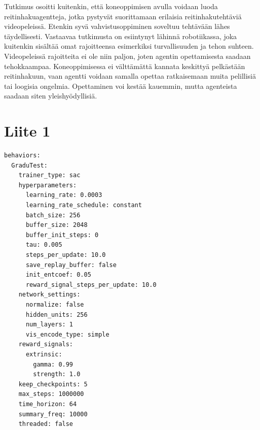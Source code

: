 \documentclass[utf8]{gradu3}
\begin{document}
Tutkimus osoitti kuitenkin, että koneoppimisen avulla voidaan luoda reitinhakuagentteja, jotka pystyvät suorittamaan erilaisia reitinhakutehtäviä videopeleissä. Etenkin syvä vahvistusoppiminen soveltuu tehtävään lähes täydellisesti. Vastaavaa tutkimusta on esiintynyt lähinnä robotiikassa, joka kuitenkin sisältää omat rajoitteensa esimerkiksi turvallisuuden ja tehon suhteen. Videopeleissä rajoitteita ei ole niin paljon, joten agentin opettamisesta saadaan tehokkaampaa. Koneoppimisessa ei välttämättä kannata keskittyä pelkästään reitinhakuun, vaan agentti voidaan samalla opettaa ratkaisemaan muita pelillisiä tai loogisia ongelmia. Opettaminen voi kestää kauemmin, mutta agenteista saadaan siten yleishyödyllisiä.

\printbibliography


\appendix

\section{Liite 1}
\label{hyperparametrit}

\begin{verbatim}
behaviors:
  GraduTest:
    trainer_type: sac
    hyperparameters:
      learning_rate: 0.0003
      learning_rate_schedule: constant
      batch_size: 256
      buffer_size: 2048
      buffer_init_steps: 0
      tau: 0.005
      steps_per_update: 10.0
      save_replay_buffer: false
      init_entcoef: 0.05
      reward_signal_steps_per_update: 10.0
    network_settings:
      normalize: false
      hidden_units: 256
      num_layers: 1
      vis_encode_type: simple
    reward_signals:
      extrinsic:
        gamma: 0.99
        strength: 1.0
    keep_checkpoints: 5
    max_steps: 1000000
    time_horizon: 64
    summary_freq: 10000
    threaded: false
\end{verbatim}
\end{document}
